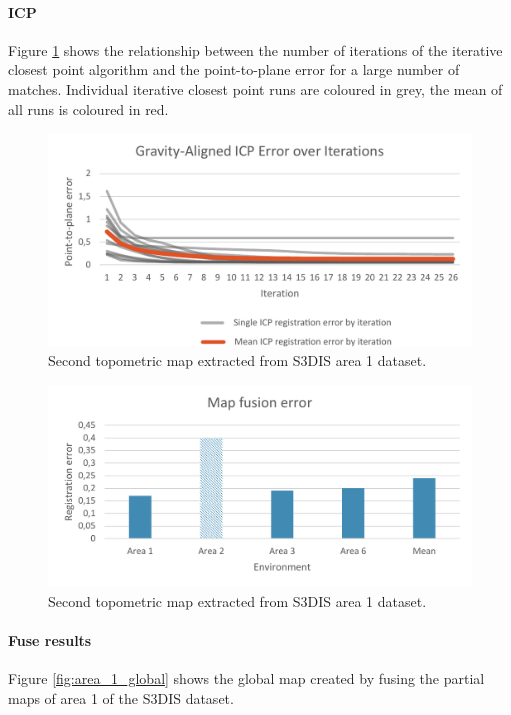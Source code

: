\paragraph{ICP}
Figure \ref{fig:icp_convergence} shows the relationship between the number of iterations of the iterative closest point algorithm and the point-to-plane error for a large number of matches. Individual iterative closest point runs are coloured in grey, the mean of all runs is coloured in red.

\begin{figure}[h]
    \centering
    \includegraphics*[width=\textwidth]{./fig/icp_convergence.pdf}
    \caption{Second topometric map extracted from S3DIS area 1 dataset.}
    \label{fig:icp_convergence}
\end{figure}

\begin{figure}[h]
    \centering
    \includegraphics*[width=\textwidth]{./fig/map_fuse_chart.pdf}
    \caption{Second topometric map extracted from S3DIS area 1 dataset.}
    \label{fig:area_1_match_02}
\end{figure}

\paragraph{Fuse results}
Figure \ref{fig:area_1_global} shows the global map created by fusing the partial maps of area 1 of the S3DIS dataset. 

